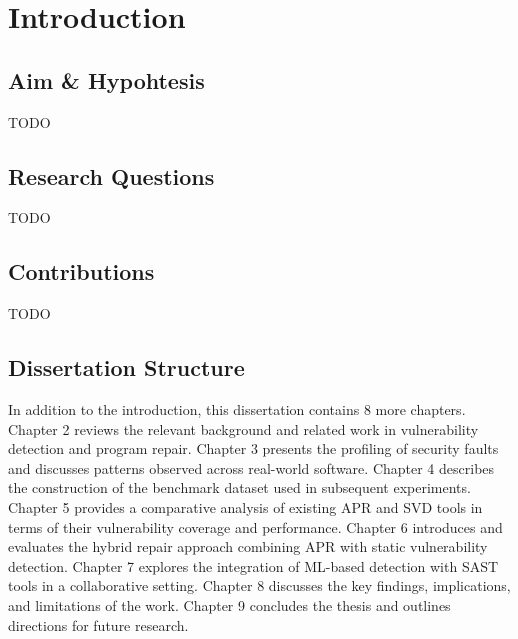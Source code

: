 \chapter{Introduction} \label{chap:intro}





\section{Aim \& Hypohtesis} \label{sec:ae4}

TODO

\section{Research Questions} \label{sec:ae4}

TODO

\section{Contributions} \label{sec:ae4}

TODO

\section{Dissertation Structure} \label{sec:struct}

In addition to the introduction, this dissertation contains 8 more chapters. Chapter 2 reviews the relevant background and related work in vulnerability detection and program repair. Chapter 3 presents the profiling of security faults and discusses patterns observed across real-world software. Chapter 4 describes the construction of the benchmark dataset used in subsequent experiments. Chapter 5 provides a comparative analysis of existing APR and SVD tools in terms of their vulnerability coverage and performance. Chapter 6 introduces and evaluates the hybrid repair approach combining APR with static vulnerability detection. Chapter 7 explores the integration of ML-based detection with SAST tools in a collaborative setting. Chapter 8 discusses the key findings, implications, and limitations of the work. Chapter 9 concludes the thesis and outlines directions for future research.
